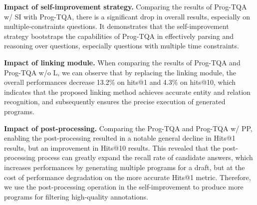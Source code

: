 \documentclass[10pt, a4paper]{article}
\begin{document}
\textbf{Impact of self-improvement strategy.} 
Comparing the results of Prog-TQA w/ SI with Prog-TQA, there is a significant drop in overall results, especially on multiple-constraints questions. It demonstrates that the self-improvement strategy bootstraps the capabilities of Prog-TQA in effectively parsing and reasoning over questions, especially questions with multiple time constraints.

\textbf{Impact of linking module.} When comparing the results of Prog-TQA and Prog-TQA w/o L, we can observe that by replacing the linking module, the overall performances decrease 13.2\% on hits@1 and 4.3\% on hits@10, which indicates that the proposed linking method achieves accurate entity and relation recognition, and subsequently ensures the precise execution of generated programs.

\textbf{Impact of post-processing.} Comparing the Prog-TQA and Prog-TQA w/ PP, enabling the post-processing resulted in a notable general decline in Hits@1 results, but an improvement in Hits@10 results. 
This revealed that the post-processing process can greatly expand the recall rate of candidate answers, which increases performances by generating multiple programs for a draft, but at the cost of performance degradation on the more accurate Hits@1 metric. Therefore, we use the post-processing operation in the self-improvement to produce more programs for filtering high-quality annotations.
\end{document}
